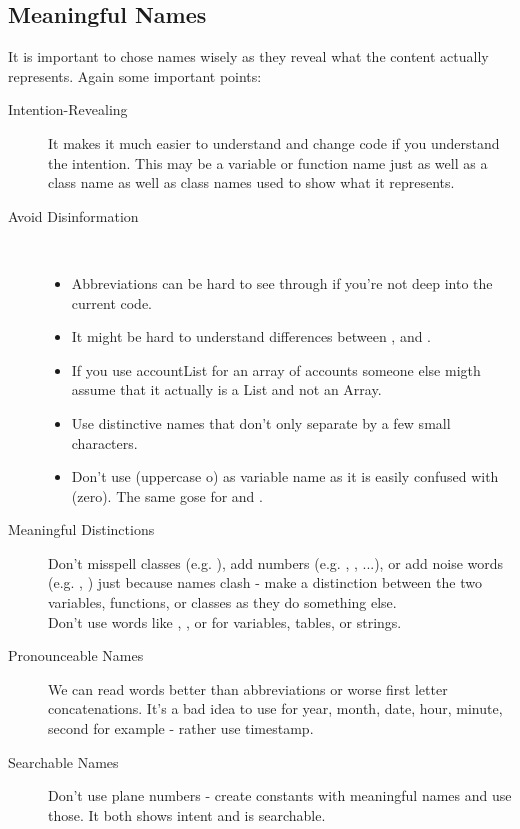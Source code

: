 \documentclass[a4paper, twocolumn]{article}
\newcommand{\code}[1]{\texttt{\color{black}{#1}}}
\begin{document}
\subsection{Meaningful Names}
It is important to chose names wisely as they reveal what the content actually represents. Again some important points:
\begin{description}
	\item[Intention-Revealing] It makes it much easier to understand and change code if you understand the intention. This may be a variable or function name just as well as a class name as well as class names used to show what it represents.
	\item[Avoid Disinformation]\mbox{} \\ [-1.5\baselineskip]
		\begin{itemize}
			\item Abbreviations can be hard to see through if you're not deep into the current code.
			\item It might be hard to understand differences between \code{account}, \code{theAccount} and \code{accountInfo}.
			\item If you use accountList for an array of accounts someone else migth assume that it actually is a List and not an Array.
			\item Use distinctive names that don't only separate by a few small characters.
			\item Don't use \code{O} (uppercase o) as variable name as it is easily confused with \code{0} (zero). The same gose for \code{l} and \code{1}.
		\end{itemize}
	\item[Meaningful Distinctions] Don't misspell classes (e.g. \code{clazz}), add numbers (e.g. \code{a1}, \code{a2}, ...), or add noise words (e.g. \code{...Info},  \code{...Data}) just because names clash - make a distinction between the two variables, functions, or classes as they do something else.\\
		Don't use words like \code{variable}, \code{table}, or \code{string} for variables, tables, or strings.
	\item[Pronounceable Names] We can read words better than abbreviations or worse first letter concatenations. It's a bad idea to use \code{ymdhmi} for year, month, date, hour, minute, second for example - rather use timestamp.
	\item[Searchable Names] Don't use plane numbers - create constants with meaningful names and use those. It both shows intent and is searchable.

\end{description}
\end{document}
